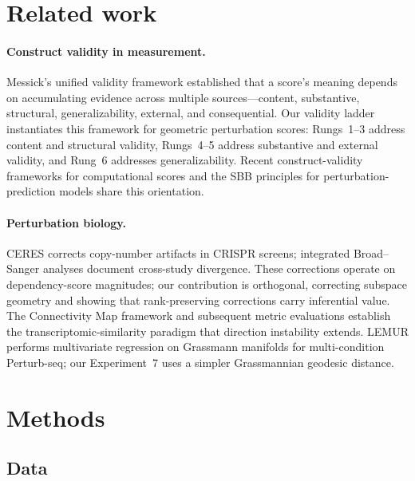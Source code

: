 \documentclass[11pt]{article}
\begin{document}
\section{Related work}

\paragraph{Construct validity in measurement.}
Messick's unified validity framework \citep{messick1995validity} established
that a score's meaning depends on accumulating evidence across multiple
sources---content, substantive, structural, generalizability, external,
and consequential. Our validity ladder instantiates this framework for
geometric perturbation scores: Rungs~1--3 address content and structural
validity, Rungs~4--5 address substantive and external validity, and
Rung~6 addresses generalizability. Recent construct-validity
frameworks for computational scores \citep{freiesleben2025benchmarking,
watson2025measuring} and the SBB principles for perturbation-prediction
models \citep{sbb2026principles} share this orientation.

\paragraph{Perturbation biology.}
CERES \citep{meyers2017ceres} corrects copy-number artifacts in CRISPR
screens; integrated Broad--Sanger analyses \citep{pacini2021integrated}
document cross-study divergence. These corrections operate on
dependency-score magnitudes; our contribution is orthogonal, correcting
subspace geometry and showing that rank-preserving corrections carry
inferential value. The Connectivity Map framework
\citep{subramanian2017next,lamb2006connectivity} and subsequent metric
evaluations \citep{li2020comprehensive} establish the
transcriptomic-similarity paradigm that direction instability extends.
LEMUR \citep{ahlmanneltze2025lemur} performs multivariate regression on
Grassmann manifolds for multi-condition Perturb-seq; our Experiment~7 uses
a simpler Grassmannian geodesic distance.

\section{Methods}

\subsection{Data}
\end{document}
